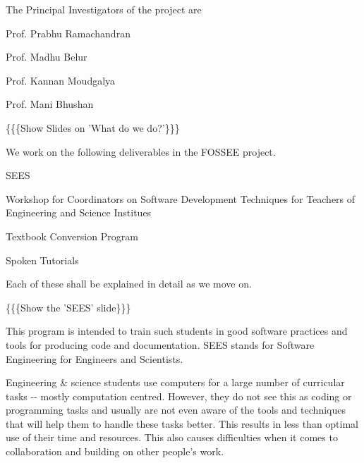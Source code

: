 \documentclass[a4paper,english]{article}
\begin{document}

The Principal Investigators of the project are
\begin{list}{.}
{
\setlength{\rightmargin}{\leftmargin}
}

\item Prof. Prabhu Ramachandran

\item Prof. Madhu Belur

\item Prof. Kannan Moudgalya

\item Prof. Mani Bhushan
\end{list}


\{\{\{Show Slides on 'What do we do?'\}\}\}


We work on the following deliverables in the FOSSEE project.
\setcounter{listcnt0}{0}
\begin{list}{.}
{
\setlength{\rightmargin}{\leftmargin}
}

\item SEES

\item Workshop for Coordinators on Software Development Techniques for Teachers of Engineering and Science Institues

\item Textbook Conversion Program

\item Spoken Tutorials
\end{list}

Each of these shall be explained in detail as we move on.


\{\{\{Show the 'SEES' slide\}\}\}


This program is intended to train such students in good software practices and tools for producing code and documentation. SEES stands for Software Engineering for Engineers and Scientists.

Engineering \& science students use computers for a large number of curricular tasks -{}- mostly computation centred. However, they do not see this as coding or programming tasks and usually are not even aware of the tools and techniques that will help them to handle these tasks better. This results in less than optimal use of their time and resources. This also causes difficulties when it comes to collaboration and building on other people's work.
\end{document}
